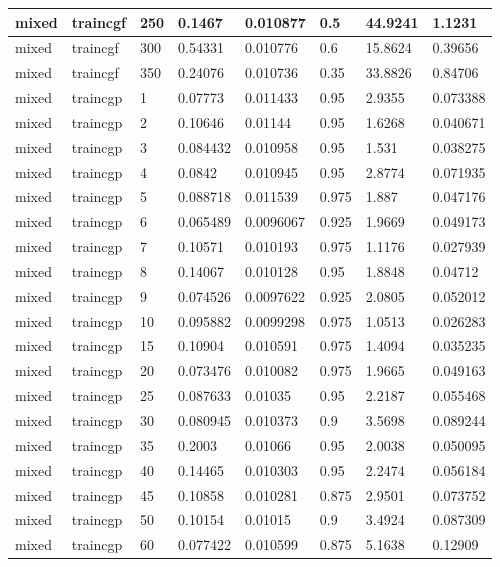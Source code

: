 \begin{longtable}{llllllll}
mixed & traincgf & 250 & 0.1467 & 0.010877 & 0.5 & 44.9241 & 1.1231 \\ \hline 
mixed & traincgf & 300 & 0.54331 & 0.010776 & 0.6 & 15.8624 & 0.39656 \\ \hline 
mixed & traincgf & 350 & 0.24076 & 0.010736 & 0.35 & 33.8826 & 0.84706 \\ \hline 
mixed & traincgp & 1 & 0.07773 & 0.011433 & 0.95 & 2.9355 & 0.073388 \\ \hline 
mixed & traincgp & 2 & 0.10646 & 0.01144 & 0.95 & 1.6268 & 0.040671 \\ \hline 
mixed & traincgp & 3 & 0.084432 & 0.010958 & 0.95 & 1.531 & 0.038275 \\ \hline 
mixed & traincgp & 4 & 0.0842 & 0.010945 & 0.95 & 2.8774 & 0.071935 \\ \hline 
mixed & traincgp & 5 & 0.088718 & 0.011539 & 0.975 & 1.887 & 0.047176 \\ \hline 
mixed & traincgp & 6 & 0.065489 & 0.0096067 & 0.925 & 1.9669 & 0.049173 \\ \hline 
mixed & traincgp & 7 & 0.10571 & 0.010193 & 0.975 & 1.1176 & 0.027939 \\ \hline 
mixed & traincgp & 8 & 0.14067 & 0.010128 & 0.95 & 1.8848 & 0.04712 \\ \hline 
mixed & traincgp & 9 & 0.074526 & 0.0097622 & 0.925 & 2.0805 & 0.052012 \\ \hline 
mixed & traincgp & 10 & 0.095882 & 0.0099298 & 0.975 & 1.0513 & 0.026283 \\ \hline 
mixed & traincgp & 15 & 0.10904 & 0.010591 & 0.975 & 1.4094 & 0.035235 \\ \hline 
mixed & traincgp & 20 & 0.073476 & 0.010082 & 0.975 & 1.9665 & 0.049163 \\ \hline 
mixed & traincgp & 25 & 0.087633 & 0.01035 & 0.95 & 2.2187 & 0.055468 \\ \hline 
mixed & traincgp & 30 & 0.080945 & 0.010373 & 0.9 & 3.5698 & 0.089244 \\ \hline 
mixed & traincgp & 35 & 0.2003 & 0.01066 & 0.95 & 2.0038 & 0.050095 \\ \hline 
mixed & traincgp & 40 & 0.14465 & 0.010303 & 0.95 & 2.2474 & 0.056184 \\ \hline 
mixed & traincgp & 45 & 0.10858 & 0.010281 & 0.875 & 2.9501 & 0.073752 \\ \hline 
mixed & traincgp & 50 & 0.10154 & 0.01015 & 0.9 & 3.4924 & 0.087309 \\ \hline 
mixed & traincgp & 60 & 0.077422 & 0.010599 & 0.875 & 5.1638 & 0.12909 \\ \hline 

\end{longtable}
